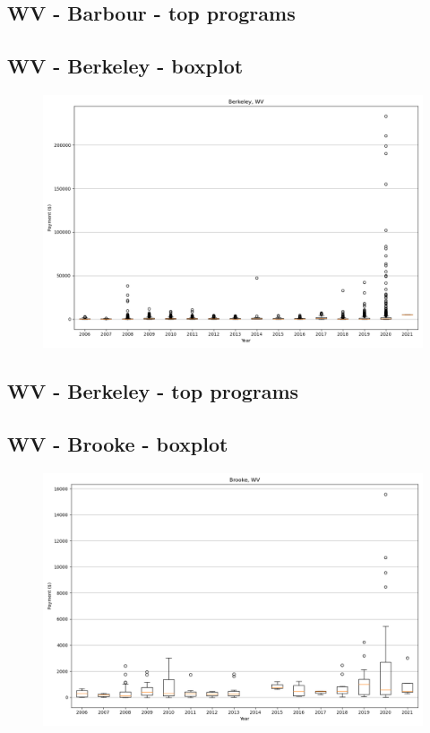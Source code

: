 \subsection*{WV - Barbour - top programs}

\newpage
\subsection*{WV - Berkeley - boxplot}
\begin{figure}[h]
\centering
\includegraphics[width=7in]{../output/boxplots/counties/Berkeley-WV_boxplot.png}
\end{figure}


\subsection*{WV - Berkeley - top programs}

\newpage
\subsection*{WV - Brooke - boxplot}
\begin{figure}[h]
\centering
\includegraphics[width=7in]{../output/boxplots/counties/Brooke-WV_boxplot.png}
\end{figure}


